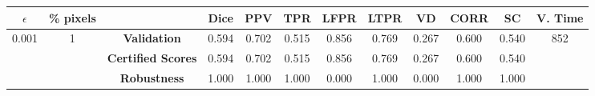 \begin{longtable}{ c  c | c | c  c  c  c  c  c  c c c}
\toprule \textbf{$\epsilon$} & \textbf{\% pixels} & & \textbf{Dice} & \textbf{PPV} & \textbf{TPR} & \textbf{LFPR} & \textbf{LTPR} & \textbf{VD} & \textbf{CORR} & \textbf{SC} & \textbf{V. Time} \\
\midrule 
\multirow{3}{*}{0.001}  & \multirow{3}{*}{1} &\textbf{Validation} & 0.594 & 0.702 & 0.515 & 0.856 & 0.769 & 0.267 & 0.600 & 0.540 & \multirow{3}{*}{852} \\
 & & \textbf{Certified Scores} & 0.594 & 0.702 & 0.515 & 0.856 & 0.769 & 0.267 & 0.600 & 0.540 & \\
& & \textbf{Robustness} & 1.000 & 1.000 & 1.000 & 0.000 & 1.000 & 0.000 & 1.000 & 1.000 & \\
\end{longtable}